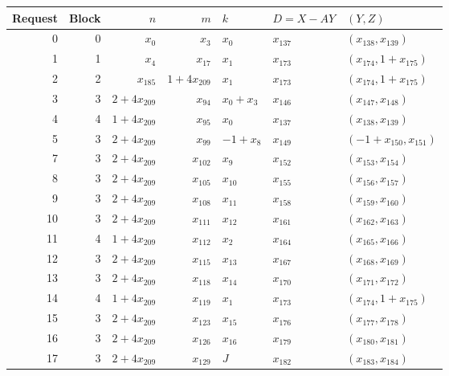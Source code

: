 \begin{center}\small
\begin{tabular}{rrrrlll}
\toprule
Request & Block & $n$ & $m$ & $k$ & $D=X-AY$ & $(Y,Z)$\\
\midrule
0 & 0 & $x_{0}$ & $x_{3}$ & $x_{0}$ & $x_{137}$ & $(x_{138},x_{139})$\\
1 & 1 & $x_{4}$ & $x_{17}$ & $x_{1}$ & $x_{173}$ & $(x_{174},1+x_{175})$\\
2 & 2 & $x_{185}$ & $1+4x_{209}$ & $x_{1}$ & $x_{173}$ & $(x_{174},1+x_{175})$\\
3 & 3 & $2+4x_{209}$ & $x_{94}$ & $x_{0}+x_{3}$ & $x_{146}$ & $(x_{147},x_{148})$\\
4 & 4 & $1+4x_{209}$ & $x_{95}$ & $x_{0}$ & $x_{137}$ & $(x_{138},x_{139})$\\
5 & 3 & $2+4x_{209}$ & $x_{99}$ & $-1+x_{8}$ & $x_{149}$ & $(-1+x_{150},x_{151})$\\
7 & 3 & $2+4x_{209}$ & $x_{102}$ & $x_{9}$ & $x_{152}$ & $(x_{153},x_{154})$\\
8 & 3 & $2+4x_{209}$ & $x_{105}$ & $x_{10}$ & $x_{155}$ & $(x_{156},x_{157})$\\
9 & 3 & $2+4x_{209}$ & $x_{108}$ & $x_{11}$ & $x_{158}$ & $(x_{159},x_{160})$\\
10 & 3 & $2+4x_{209}$ & $x_{111}$ & $x_{12}$ & $x_{161}$ & $(x_{162},x_{163})$\\
11 & 4 & $1+4x_{209}$ & $x_{112}$ & $x_{2}$ & $x_{164}$ & $(x_{165},x_{166})$\\
12 & 3 & $2+4x_{209}$ & $x_{115}$ & $x_{13}$ & $x_{167}$ & $(x_{168},x_{169})$\\
13 & 3 & $2+4x_{209}$ & $x_{118}$ & $x_{14}$ & $x_{170}$ & $(x_{171},x_{172})$\\
14 & 4 & $1+4x_{209}$ & $x_{119}$ & $x_{1}$ & $x_{173}$ & $(x_{174},1+x_{175})$\\
15 & 3 & $2+4x_{209}$ & $x_{123}$ & $x_{15}$ & $x_{176}$ & $(x_{177},x_{178})$\\
16 & 3 & $2+4x_{209}$ & $x_{126}$ & $x_{16}$ & $x_{179}$ & $(x_{180},x_{181})$\\
17 & 3 & $2+4x_{209}$ & $x_{129}$ & $J$ & $x_{182}$ & $(x_{183},x_{184})$\\
\bottomrule
\end{tabular}
\end{center}
